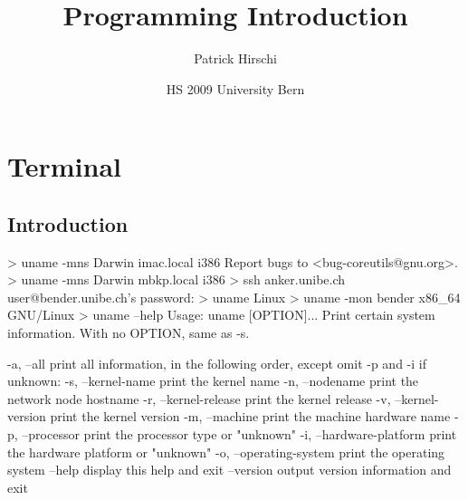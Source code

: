 \documentclass[10pt,a4paper]{scrartcl}
\date{HS 2009 University Bern}
\author{Patrick Hirschi}
\title{Programming Introduction}
\begin{document}
\maketitle
\tableofcontents
\newpage
\section{Terminal}
\subsection{Introduction}
\begin{terminalcode}
> uname -mns
  Darwin imac.local i386
  Report bugs to <bug-coreutils@gnu.org>.
> uname -mns
  Darwin mbkp.local i386
> ssh anker.unibe.ch
  user@bender.unibe.ch's password: 
> uname
  Linux
> uname -mon
  bender x86_64 GNU/Linux
> uname --help
  Usage: uname [OPTION]...
  Print certain system information.  With no OPTION, same as -s.
  
    -a, --all                print all information, in the following order,
                               except omit -p and -i if unknown:
    -s, --kernel-name        print the kernel name
    -n, --nodename           print the network node hostname
    -r, --kernel-release     print the kernel release
    -v, --kernel-version     print the kernel version
    -m, --machine            print the machine hardware name
    -p, --processor          print the processor type or "unknown"
    -i, --hardware-platform  print the hardware platform or "unknown"
    -o, --operating-system   print the operating system
        --help     display this help and exit
        --version  output version information and exit
\end{terminalcode}

\end{document}
